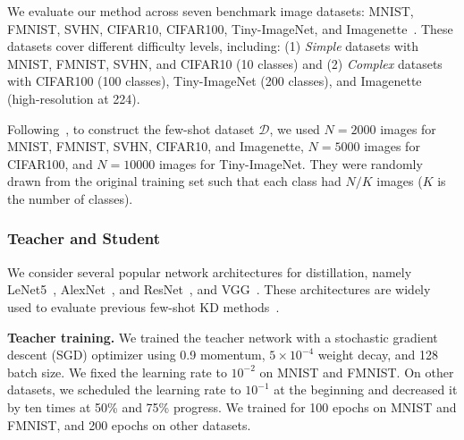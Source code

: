 \begin{foldable}
  We evaluate our method across seven benchmark image datasets: MNIST, FMNIST, SVHN, CIFAR10, CIFAR100, Tiny-ImageNet, and Imagenette~\cite{lecun1998gradient,xiao2017fashion,netzer2011reading,le2015tiny,krizhevsky2009learning,howard2020imagenette}.
  These datasets cover different difficulty levels, including: (1) \textit{Simple} datasets with MNIST, FMNIST, SVHN, and CIFAR10 (10 classes) and (2) \textit{Complex} datasets with CIFAR100 (100 classes), Tiny-ImageNet (200 classes), and Imagenette (high-resolution at 224).
\end{foldable}

\begin{foldable}
  Following~\cite{wang2020neural,nguyen2022black}, to construct the few-shot dataset $\mathcal{D}$, we used $N = 2000$ images for MNIST, FMNIST, SVHN, CIFAR10, and Imagenette, $N=5000$ images for CIFAR100, and $N=10000$ images for Tiny-ImageNet.
  They were randomly drawn from the original training set such that each class had $N/K$ images ($K$ is the number of classes).
\end{foldable}

\subsubsection{Teacher and Student}
\begin{foldable}
  We consider several popular network architectures for distillation, namely LeNet5~\cite{lecun1998gradient}, AlexNet~\cite{krizhevsky2012imagenet}, and ResNet~\cite{he2016deep}, and VGG~\cite{simonyan2014very}.
  These architectures are widely used to evaluate previous few-shot \ac{KD} methods~\cite{kimura2018few,wang2020neural,nguyen2022black}.
\end{foldable}

\begin{foldable}
  \textbf{Teacher training.} We trained the teacher network with a stochastic gradient descent (SGD) optimizer using 0.9 momentum, $5\times10^{-4}$ weight decay, and 128 batch size.
  We fixed the learning rate to $10^{-2}$ on MNIST and FMNIST.
  On other datasets, we scheduled the learning rate to $10^{-1}$ at the beginning and decreased it by ten times at 50\% and 75\% progress.
  We trained for 100 epochs on MNIST and FMNIST, and 200 epochs on other datasets.
\end{foldable}

